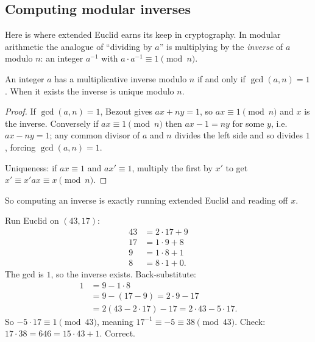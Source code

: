 \subsection*{Computing modular inverses}

Here is where extended Euclid earns its keep in cryptography. In modular arithmetic the analogue of
``dividing by $a$'' is multiplying by the \emph{inverse} of $a$ modulo $n$: an integer $a^{-1}$ with
$a \cdot a^{-1} \equiv 1 \pmod n$.

\begin{theorem}
\label{ch04:thm-inverse}
An integer $a$ has a multiplicative inverse modulo $n$ if and only if $\gcd(a, n) = 1$. When it
exists the inverse is unique modulo $n$.
\end{theorem}

\begin{proof}
If $\gcd(a, n) = 1$, Bezout gives $ax + ny = 1$, so $ax \equiv 1 \pmod n$ and $x$ is the inverse.
Conversely if $ax \equiv 1 \pmod n$ then $ax - 1 = ny$ for some $y$, i.e. $ax - ny = 1$; any common
divisor of $a$ and $n$ divides the left side and so divides $1$, forcing $\gcd(a, n) = 1$.

Uniqueness: if $ax \equiv 1$ and $ax' \equiv 1$, multiply the first by $x'$ to get
$x' \equiv x'ax \equiv x \pmod n$.
\end{proof}

So computing an inverse is exactly running extended Euclid and reading off $x$.

\begin{example}
\label{ch04:ex-inverse}
Run Euclid on $(43, 17)$:
\[
\begin{aligned}
43 &= 2 \cdot 17 + 9 \\
17 &= 1 \cdot 9 + 8 \\
 9 &= 1 \cdot 8 + 1 \\
 8 &= 8 \cdot 1 + 0.
\end{aligned}
\]
The gcd is $1$, so the inverse exists. Back-substitute:
\[
\begin{aligned}
1 &= 9 - 1 \cdot 8 \\
  &= 9 - (17 - 9) = 2 \cdot 9 - 17 \\
  &= 2(43 - 2 \cdot 17) - 17 = 2 \cdot 43 - 5 \cdot 17.
\end{aligned}
\]
So $-5 \cdot 17 \equiv 1 \pmod{43}$, meaning $17^{-1} \equiv -5 \equiv 38 \pmod{43}$.
Check: $17 \cdot 38 = 646 = 15 \cdot 43 + 1$. Correct.
\end{example}

